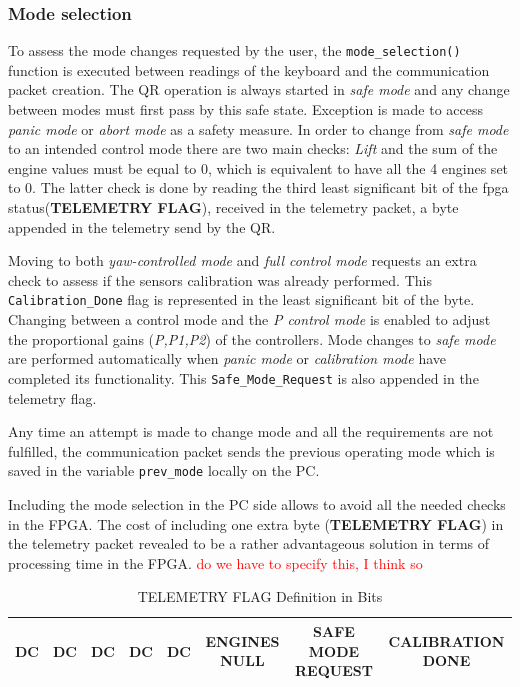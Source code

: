 \documentclass{article}
\newcommand\worries[1]{\textcolor{red}{#1}} %
\begin{document}

\subsubsection{Mode selection}
\label{sec:modeselection}
To assess the mode changes requested by the user, the \texttt{mode\_selection()} function is executed between readings of the keyboard and the communication packet creation. The QR operation is always started in \textit{safe mode} and any change between modes must first pass by this safe state. Exception is made to access \textit{panic mode} or \textit{abort mode} as a safety measure. In order to change from \textit{safe mode} to an intended control mode there are two main checks: \textit{Lift} and the sum of the engine values must be equal to $0$, which is equivalent to have all the 4 engines set to $0$. The latter check is done by reading the third least significant bit of the fpga status(\textbf{TELEMETRY FLAG}), received in the telemetry packet, a byte appended in the telemetry send by the QR. 

Moving to both \textit{yaw-controlled mode} and \textit{full control mode} requests an extra check to assess if the sensors calibration was already performed. This \texttt{Calibration\_Done} flag is represented in the least significant bit of the byte. Changing between a control mode and the \textit{P control mode} is enabled to adjust the proportional gains (\textit{P,P1,P2}) of the controllers. Mode changes to \textit{safe mode} are performed automatically when \textit{panic mode} or \textit{calibration mode} have completed its functionality. This \texttt{Safe\_Mode\_Request} is also appended in the telemetry flag. 

Any time an attempt is made to change mode and all the requirements are not fulfilled, the communication packet sends the previous operating mode which is saved in the variable \texttt{prev\_mode} locally on the PC.

Including the mode selection in the PC side allows to avoid all the needed checks in the FPGA. The cost of including one extra byte (\textbf{TELEMETRY FLAG}) in the telemetry packet revealed to be a rather advantageous solution in terms of processing time in the FPGA. \worries{do we have to specify this, I think so}

\begin{table}[h]
\centering
\begin{tabular}{|c|c|c|c|c|c|c|c|}
\hline 
DC & DC & DC & DC & DC & ENGINES NULL & SAFE MODE REQUEST & CALIBRATION DONE \\
\hline 
\end{tabular} 
\caption{TELEMETRY FLAG Definition in Bits}
\label{tbl:TelFlagDef}
\end{table}
\end{document}
